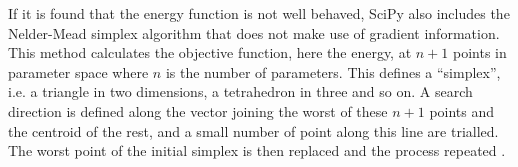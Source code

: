 If it is found that the energy function is not well behaved, SciPy also includes the Nelder-Mead simplex algorithm that does not make use of gradient information. This method calculates the objective function, here the energy, at $n+1$ points in parameter space where $n$ is the number of parameters. This defines a ``simplex'', i.e. a triangle in two dimensions, a tetrahedron in three and so on. A search direction is defined along the vector joining the worst of these $n+1$ points and the centroid of the rest, and a small number of point along this line are trialled. The worst point of the initial simplex is then replaced and the process repeated \citep{Nelder1965,Gao2012}.























































